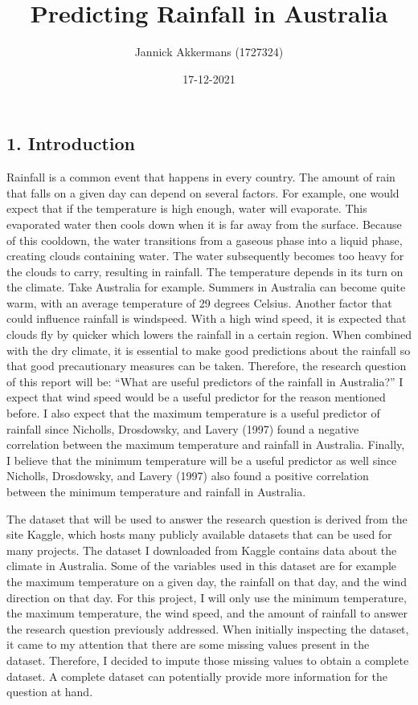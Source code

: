\documentclass[
]{article}
\title{Predicting Rainfall in Australia}
\author{Jannick Akkermans (1727324)}
\date{17-12-2021}
\begin{document}
\maketitle

\hypertarget{introduction}{%
\subsection{1. Introduction}\label{introduction}}

Rainfall is a common event that happens in every country. The amount of
rain that falls on a given day can depend on several factors. For
example, one would expect that if the temperature is high enough, water
will evaporate. This evaporated water then cools down when it is far
away from the surface. Because of this cooldown, the water transitions
from a gaseous phase into a liquid phase, creating clouds containing
water. The water subsequently becomes too heavy for the clouds to carry,
resulting in rainfall. The temperature depends in its turn on the
climate. Take Australia for example. Summers in Australia can become
quite warm, with an average temperature of 29 degrees Celsius. Another
factor that could influence rainfall is windspeed. With a high wind
speed, it is expected that clouds fly by quicker which lowers the
rainfall in a certain region. When combined with the dry climate, it is
essential to make good predictions about the rainfall so that good
precautionary measures can be taken. Therefore, the research question of
this report will be: ``What are useful predictors of the rainfall in
Australia?'' I expect that wind speed would be a useful predictor for
the reason mentioned before. I also expect that the maximum temperature
is a useful predictor of rainfall since Nicholls, Drosdowsky, and Lavery
(1997) found a negative correlation between the maximum temperature and
rainfall in Australia. Finally, I believe that the minimum temperature
will be a useful predictor as well since Nicholls, Drosdowsky, and
Lavery (1997) also found a positive correlation between the minimum
temperature and rainfall in Australia.

The dataset that will be used to answer the research question is derived
from the site Kaggle, which hosts many publicly available datasets that
can be used for many projects. The dataset I downloaded from Kaggle
contains data about the climate in Australia. Some of the variables used
in this dataset are for example the maximum temperature on a given day,
the rainfall on that day, and the wind direction on that day. For this
project, I will only use the minimum temperature, the maximum
temperature, the wind speed, and the amount of rainfall to answer the
research question previously addressed. When initially inspecting the
dataset, it came to my attention that there are some missing values
present in the dataset. Therefore, I decided to impute those missing
values to obtain a complete dataset. A complete dataset can potentially
provide more information for the question at hand.
\end{document}

